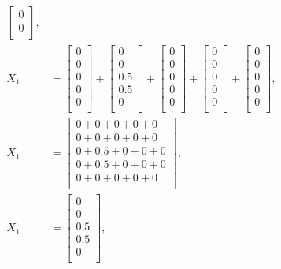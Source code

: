 \documentclass[12pt,final]{article}
\begin{document}
\begin{subequations}
\begin{align}
\begin{bmatrix}
		0 \\
		0 \\
  \end{bmatrix}, \\
  X_1 &= \begin{bmatrix}
    0 \\
    0 \\
		0 \\
		0 \\
		0 \\
  \end{bmatrix} +
	\begin{bmatrix}
    0 \\
    0 \\
		0.5 \\
		0.5 \\
		0 \\
  \end{bmatrix} +
	\begin{bmatrix}
    0 \\
    0 \\
		0 \\
		0 \\
		0 \\
  \end{bmatrix} +
	\begin{bmatrix}
    0 \\
    0 \\
		0 \\
		0 \\
		0 \\
  \end{bmatrix} +
	\begin{bmatrix}
    0 \\
    0 \\
		0 \\
		0 \\
		0 \\
  \end{bmatrix}, \\
  X_1 &= \begin{bmatrix}
    0 + 0 + 0 + 0 + 0 \\
    0 + 0 + 0 + 0 + 0 \\
		0 + 0.5 + 0 + 0 + 0 \\
		0 + 0.5 + 0 + 0 + 0 \\
 		0 + 0 + 0 + 0 + 0 \\
  \end{bmatrix}, \\
    X_1 &= \begin{bmatrix}
      0 \\
      0 \\
			0.5 \\
	 		0.5 \\
			0 \\
  \end{bmatrix},
\end{align}
\label{eq:markovequationchangeinclose1}
\end{subequations}
\end{document}
